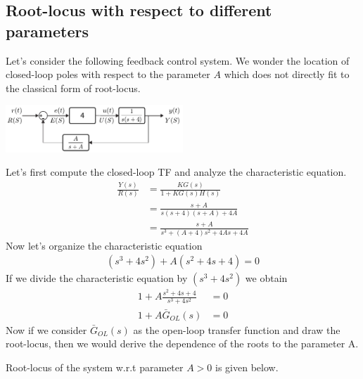 \documentclass[twoside]{article}
\begin{document}
\begin{enumerate}
\newpage

\subsection{Root-locus with respect to different parameters}

Let's consider the following feedback control system. 
We wonder the location of closed-loop
poles with respect to the parameter $A$ which does not directly fit to
the classical form of root-locus. 

\begin{center}
\begin{minipage}[h]{\linewidth}
    \begin{center}
      \includegraphics[width=0.5\textwidth]{lowpass}
    \end{center}
\end{minipage}
\end{center}

Let's first compute the closed-loop TF and analyze the characteristic
equation.
%
\begin{align*}
  \frac{Y(s)}{R(s)} &= \frac{ K G(s) }{1 + K G(s) H(s)} 
\\
  &= \frac{ s+A }{s (s+4) (s+A) + 4 A }
\\
 &= \frac{ s+A }{s^3 + (A + 4) s^2 + 4 A s + 4 A}
\end{align*}
%
Now let's organize the characteristic equation
%
\begin{align*}
(s^3 + 4 s^2) + A  (s^2 + 4 s + 4) = 0
\end{align*}
%
If we divide the characteristic equation by $(s^3 + 4 s^2)$ we obtain
%
\begin{align*}
1+ A \frac{s^2 + 4 s + 4}{s^3 + 4 s^2} &= 0
\\
1+ A \bar{G}_{OL}(s) &= 0
\end{align*}
%
Now if we consider $\bar{G}_{OL}(s)$ as the open-loop transfer
function and draw the root-locus, 
then we would derive the dependence 
of the roots to the parameter A. 

Root-locus of the system w.r.t parameter $A > 0$ is given below.


\end{enumerate}
\end{document}

